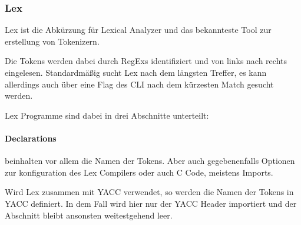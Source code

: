 \subsubsection{Lex}\label{subsubsec:lex}
Lex ist die Abkürzung für Lexical Analyzer und das bekannteste Tool zur erstellung von Tokenizern.

Die Tokens werden dabei durch \acp{RegEx} identifiziert und von links nach rechts eingelesen.
Standardmäßig sucht Lex nach dem längsten Treffer, es kann allerdings auch über eine Flag des \ac{CLI} nach dem kürzesten Match gesucht werden.

Lex Programme sind dabei in drei Abschnitte unterteilt:


\paragraph{Declarations} beinhalten vor allem die Namen der Tokens.
Aber auch gegebenenfalls Optionen zur konfiguration des Lex Compilers oder auch C Code, meistens Imports.

Wird Lex zusammen mit \ac{YACC} verwendet, so werden die Namen der Tokens in YACC definiert.
In dem Fall wird hier nur der \ac{YACC} Header importiert und der Abschnitt bleibt ansonsten weitestgehend leer.

